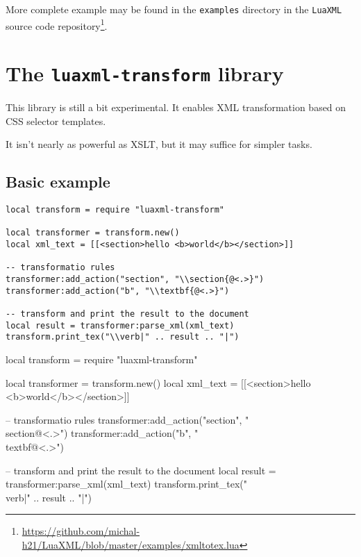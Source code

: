 \documentclass{ltxdoc}
\begin{document}
More complete example may be found in the \texttt{examples} directory in the
\texttt{LuaXML} source code
repository\footnote{\url{https://github.com/michal-h21/LuaXML/blob/master/examples/xmltotex.lua}}.

\section{The \texttt{luaxml-transform} library}

This library is still a bit experimental. It enables XML transformation based
on CSS selector templates. 

It isn't nearly as powerful as XSLT, but it may suffice for simpler tasks.

\subsection{Basic example}

\begin{verbatim}
local transform = require "luaxml-transform"

local transformer = transform.new()
local xml_text = [[<section>hello <b>world</b></section>]]

-- transformatio rules
transformer:add_action("section", "\\section{@<.>}")
transformer:add_action("b", "\\textbf{@<.>}")

-- transform and print the result to the document
local result = transformer:parse_xml(xml_text)
transform.print_tex("\\verb|" .. result .. "|")
\end{verbatim}
\begin{framed}
\begin{luacode*}
local transform = require "luaxml-transform"

local transformer = transform.new()
local xml_text = [[<section>hello <b>world</b></section>]]

-- transformatio rules
transformer:add_action("section", "\\section{@<.>}")
transformer:add_action("b", "\\textbf{@<.>}")

-- transform and print the result to the document
local result = transformer:parse_xml(xml_text)
transform.print_tex("\\verb|" .. result .. "|")
\end{luacode*}
\end{framed}
\end{document}
